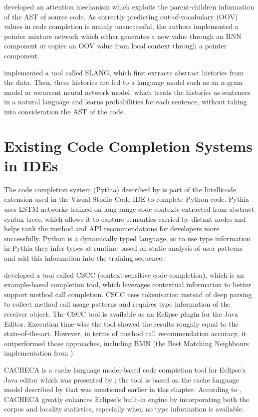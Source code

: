 \cite{Li17a} developed an attention mechanism which exploits the parent-children information of the AST of source code. As correctly predicting out-of-vocabulary (OOV) values in code completion is mainly unsuccessful, the authors implemented a pointer mixture network which either generates a new value through an RNN component or copies an OOV value from local context through a pointer component.

\cite{Rayc14a} implemented a tool called SLANG, which first extracts abstract histories from the data. Then, these histories are fed to a language model such as an n-gram model or recurrent neural network model, which treats the histories as sentences in a natural language and learns probabilities for each sentence, without taking into consideration the AST of the code.

\section{Existing Code Completion Systems in IDEs}
\label{sec:RelatedWorks-ExistingSystems}
The code completion system (Pythia) described by \cite{Svya19a} is part of the Intellicode extension used in the Visual Studio Code IDE to complete Python code. Pythia uses LSTM networks trained on long-range code contexts extracted from abstract syntax trees, which allows it to capture semantics carried by distant nodes and helps rank the method and API recommendations for developers more successfully. Python is a dynamically typed language, so to use type information in Pythia they infer types at runtime based on static analysis of user patterns and add this information into the training sequence.

\cite{Asad14a} developed a tool called CSCC (context-sensitive code completion), which is an example-based completion tool, which leverages contextual information to better support method call completion. CSCC uses tokenisation instead of deep parsing to collect method call usage patterns and requires type information of the receiver object. The CSCC tool is available as an Eclipse plugin for the Java Editor. Execution time-wise the tool showed the results roughly equal to the state-of-the-art. However, in terms of method call recommendation accuracy, it outperformed those approaches, including BMN (the Best Matching Neighbours implementation from \cite{Bruc09a}).

CACHECA is a cache language model-based code completion tool for Eclipse's Java editor which was presented by \cite{Fran15a}; the tool is based on the cache language model described by \cite{Tu14a} that was mentioned earlier in this chapter. According to \cite{Fran15a}, CACHECA greatly enhances Eclipse's built-in engine by incorporating both the corpus and locality statistics, especially when no type information is available.

